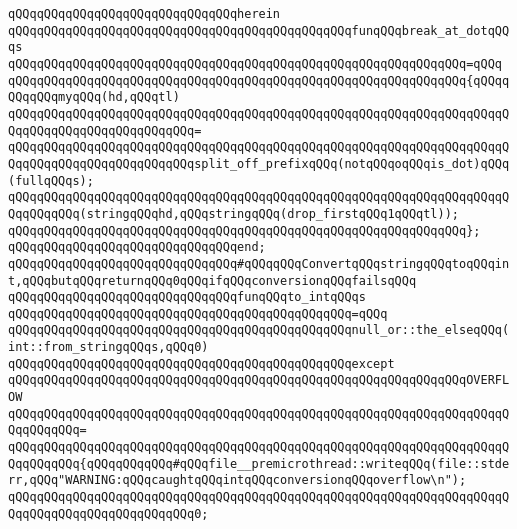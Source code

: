 \verb|qQQqqQQqqQQqqQQqqQQqqQQqqQQqqQQqherein|\newline
\verb|qQQqqQQqqQQqqQQqqQQqqQQqqQQqqQQqqQQqqQQqqQQqqQQqfunqQQqbreak_at_dotqQQqs|\newline
\verb|qQQqqQQqqQQqqQQqqQQqqQQqqQQqqQQqqQQqqQQqqQQqqQQqqQQqqQQqqQQqqQQq=qQQq|\newline
\verb|qQQqqQQqqQQqqQQqqQQqqQQqqQQqqQQqqQQqqQQqqQQqqQQqqQQqqQQqqQQqqQQq{qQQqqQQqqQQqmyqQQq(hd,qQQqtl)|\newline
\verb|qQQqqQQqqQQqqQQqqQQqqQQqqQQqqQQqqQQqqQQqqQQqqQQqqQQqqQQqqQQqqQQqqQQqqQQqqQQqqQQqqQQqqQQqqQQqqQQq=|\newline
\verb|qQQqqQQqqQQqqQQqqQQqqQQqqQQqqQQqqQQqqQQqqQQqqQQqqQQqqQQqqQQqqQQqqQQqqQQqqQQqqQQqqQQqqQQqqQQqqQQqsplit_off_prefixqQQq(notqQQqoqQQqis_dot)qQQq(fullqQQqs);|\newline
\newline
\verb|qQQqqQQqqQQqqQQqqQQqqQQqqQQqqQQqqQQqqQQqqQQqqQQqqQQqqQQqqQQqqQQqqQQqqQQqqQQqqQQq(stringqQQqhd,qQQqstringqQQq(drop_firstqQQq1qQQqtl));|\newline
\verb|qQQqqQQqqQQqqQQqqQQqqQQqqQQqqQQqqQQqqQQqqQQqqQQqqQQqqQQqqQQqqQQq};|\newline
\verb|qQQqqQQqqQQqqQQqqQQqqQQqqQQqqQQqend;|\newline
\newline
\verb|qQQqqQQqqQQqqQQqqQQqqQQqqQQqqQQq#qQQqqQQqConvertqQQqstringqQQqtoqQQqint,qQQqbutqQQqreturnqQQq0qQQqifqQQqconversionqQQqfailsqQQq|\newline
\verb|qQQqqQQqqQQqqQQqqQQqqQQqqQQqqQQqfunqQQqto_intqQQqs|\newline
\verb|qQQqqQQqqQQqqQQqqQQqqQQqqQQqqQQqqQQqqQQqqQQqqQQq=qQQq|\newline
\verb|qQQqqQQqqQQqqQQqqQQqqQQqqQQqqQQqqQQqqQQqqQQqqQQqnull_or::the_elseqQQq(int::from_stringqQQqs,qQQq0)|\newline
\verb|qQQqqQQqqQQqqQQqqQQqqQQqqQQqqQQqqQQqqQQqqQQqqQQqexcept|\newline
\verb|qQQqqQQqqQQqqQQqqQQqqQQqqQQqqQQqqQQqqQQqqQQqqQQqqQQqqQQqqQQqqQQqOVERFLOW|\newline
\verb|qQQqqQQqqQQqqQQqqQQqqQQqqQQqqQQqqQQqqQQqqQQqqQQqqQQqqQQqqQQqqQQqqQQqqQQqqQQqqQQq=|\newline
\verb|qQQqqQQqqQQqqQQqqQQqqQQqqQQqqQQqqQQqqQQqqQQqqQQqqQQqqQQqqQQqqQQqqQQqqQQqqQQqqQQq{qQQqqQQqqQQq#qQQqfile__premicrothread::writeqQQq(file::stderr,qQQq"WARNING:qQQqcaughtqQQqintqQQqconversionqQQqoverflow\n");|\newline
\verb|qQQqqQQqqQQqqQQqqQQqqQQqqQQqqQQqqQQqqQQqqQQqqQQqqQQqqQQqqQQqqQQqqQQqqQQqqQQqqQQqqQQqqQQqqQQqqQQq0;|\newline
